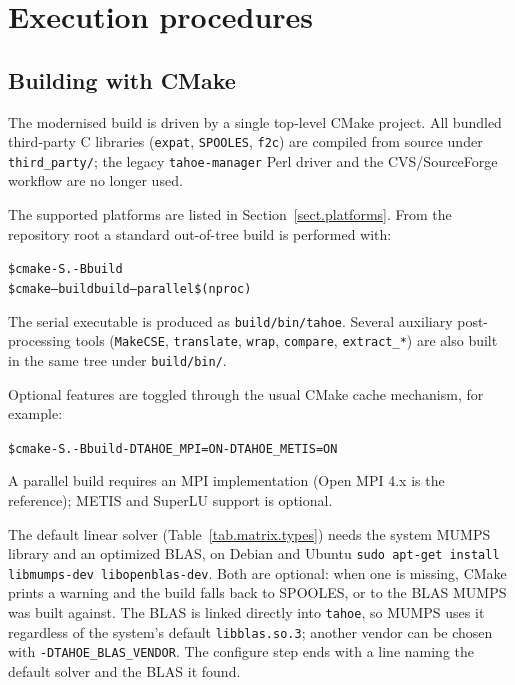 
\section{Execution procedures}
\label{sect.execution}

\subsection{Building \tahoe with CMake}
\label{sect.cmake.build}
The modernised \tahoe build is driven by a single top-level CMake
project.  All bundled third-party C libraries
(\texttt{expat}, \texttt{SPOOLES}, \texttt{f2c}) are compiled from
source under \texttt{third\_party/}; the legacy \texttt{tahoe-manager}
Perl driver and the CVS/SourceForge workflow are no longer used.

The supported platforms are listed in
Section~\ref{sect.platforms}.  From the repository root a standard
out-of-tree build is performed with:
\begin{center}
\begin{minipage}{0.85\linewidth}
\begin{alltt}
\$ cmake -S . -B build
\$ cmake --build build --parallel \$(nproc)
\end{alltt}
\end{minipage}
\end{center}
The serial executable is produced as
\texttt{build/bin/tahoe}.  Several auxiliary post-processing tools
(\texttt{MakeCSE}, \texttt{translate}, \texttt{wrap},
\texttt{compare}, \texttt{extract\_*}) are also built in the same tree
under \texttt{build/bin/}.

Optional features are toggled through the usual CMake cache
mechanism, for example:
\begin{center}
\begin{minipage}{0.85\linewidth}
\begin{alltt}
\$ cmake -S . -B build -DTAHOE_MPI=ON -DTAHOE_METIS=ON
\end{alltt}
\end{minipage}
\end{center}
A parallel build requires an MPI implementation (Open MPI 4.x is the
reference); METIS and SuperLU support is optional.

The default linear solver (Table~\ref{tab.matrix.types}) needs the system
\textsf{MUMPS} library and an optimized BLAS, on Debian and Ubuntu
\texttt{sudo apt-get install libmumps-dev libopenblas-dev}.  Both are
optional: when one is missing, CMake prints a warning and the build falls
back to \textsf{SPOOLES}, or to the BLAS \textsf{MUMPS} was built against.
The BLAS is linked directly into \texttt{tahoe}, so \textsf{MUMPS} uses it
regardless of the system's default \texttt{libblas.so.3}; another vendor
can be chosen with \texttt{-DTAHOE\_BLAS\_VENDOR}.  The configure step
ends with a line naming the default solver and the BLAS it found.

